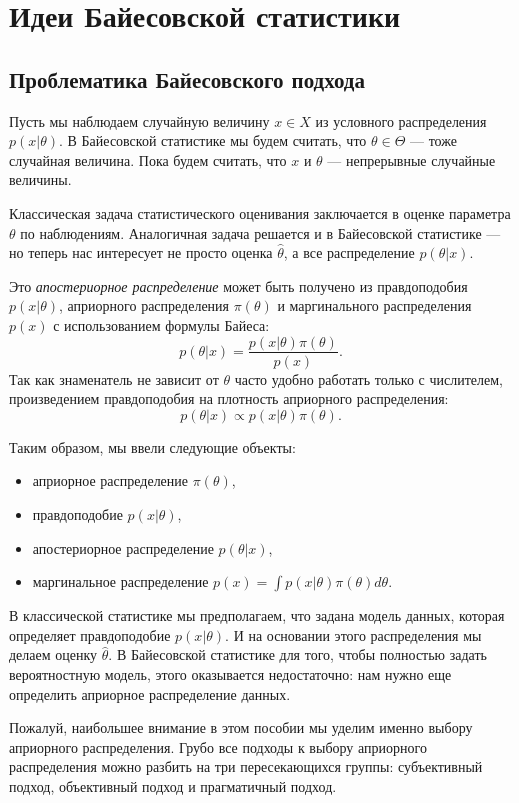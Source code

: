 \section{Идеи Байесовской статистики}

\subsection{Проблематика Байесовского подхода}

Пусть мы наблюдаем случайную величину $x \in X$ из условного распределения $p(x | \theta)$.
В Байесовской статистике мы будем считать, что $\theta \in \Theta$ --- тоже случайная величина. 
Пока будем считать, что $x$ и $\theta$ --- непрерывные случайные величины.

Классическая задача статистического оценивания заключается в оценке параметра $\theta$ по наблюдениям.
Аналогичная задача решается и в Байесовской статистике --- но теперь нас интересует не просто оценка $\hat{\theta}$,
а все распределение $p(\theta|x)$.

Это \emph{апостериорное распределение} может быть получено из правдоподобия $p(x| \theta)$, априорного распределения $\pi(\theta)$ и маргинального распределения $p(x)$
с использованием формулы Байеса:
\[
p(\theta | x) = \frac{p(x| \theta) \pi(\theta)}{p(x)}.
\]
Так как знаменатель не зависит от $\theta$ часто удобно работать только с числителем, произведением правдоподобия на плотность априорного распределения:
\[
p(\theta | x) \propto p(x| \theta) \pi(\theta).
\]

Таким образом, мы ввели следующие объекты:
\begin{itemize}
	\item априорное распределение $\pi(\theta)$,
	\item правдоподобие $p(x| \theta)$,
	\item апостериорное распределение $p(\theta | x)$,
	\item маргинальное распределение $p(x) = \int p(x| \theta) \pi(\theta) d\theta$.
\end{itemize}

В классической статистике мы предполагаем, что задана модель данных,
которая определяет правдоподобие $p(x| \theta)$.
И на основании этого распределения мы делаем оценку $\hat{\theta}$.
В Байесовской статистике для того, чтобы полностью задать вероятностную модель, этого оказывается недостаточно:
нам нужно еще определить априорное распределение данных.

Пожалуй, наибольшее внимание в этом пособии мы уделим именно выбору априорного распределения.
Грубо все подходы к выбору априорного распределения можно разбить на три пересекающихся группы:
субъективный подход, объективный подход и прагматичный подход.

